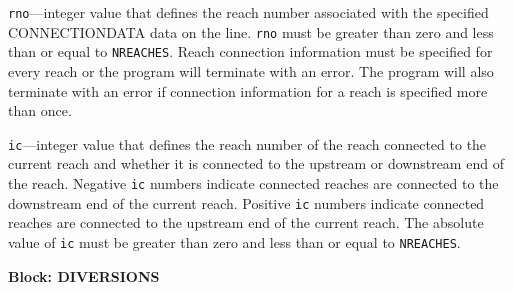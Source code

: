 \begin{description}
\item \texttt{rno}---integer value that defines the reach number associated with the specified CONNECTIONDATA data on the line. \texttt{rno} must be greater than zero and less than or equal to \texttt{NREACHES}. Reach connection information must be specified for every reach or the program will terminate with an error.  The program will also terminate with an error if connection information for a reach is specified more than once.

\item \texttt{ic}---integer value that defines the reach number of the reach connected to the current reach and whether it is connected to the upstream or downstream end of the reach. Negative \texttt{ic} numbers indicate connected reaches are connected to the downstream end of the current reach. Positive \texttt{ic} numbers indicate connected reaches are connected to the upstream end of the current reach. The absolute value of \texttt{ic} must be greater than zero and less than or equal to \texttt{NREACHES}.

\end{description}
\item \textbf{Block: DIVERSIONS}


